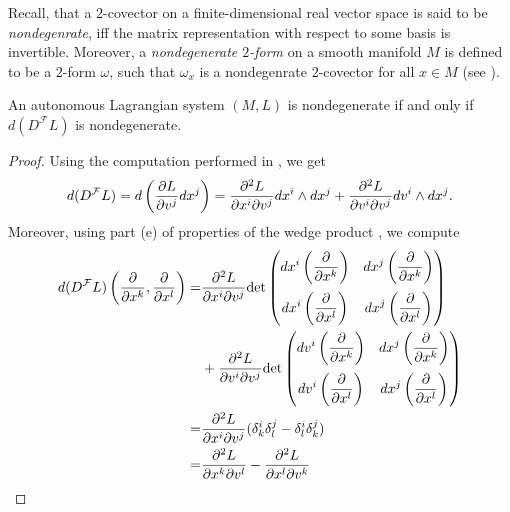 Recall, that a $2$-covector on a finite-dimensional real vector space is said to be \emph{nondegenrate}, iff the matrix representation with respect to some basis is invertible. Moreover, a \emph{nondegenerate $2$-form} on a smooth manifold $M$ is defined to be a $2$-form $\omega$, such that $\omega_x$ is a nondegenrate $2$-covector for all $x \in M$ (see \cite[565,567]{lee:smooth_manifolds:2013}). 

\begin{proposition}
	An autonomous Lagrangian system $(M,L)$ is nondegenerate if and only if $d(D^\mathcal{F}L)$ is nondegenerate.
\end{proposition}

\begin{proof}
	Using the computation performed in \cite[363]{lee:smooth_manifolds:2013}, we get
	\begin{equation*}
		d(D^\mathcal{F}L) = d\del[3]{\frac{\partial L}{\partial v^j}dx^j} = \frac{\partial^2 L}{\partial x^i\partial v^j}dx^i \wedge dx^j + \frac{\partial^2L}{\partial v^i\partial v^j}dv^i \wedge dx^j.
	\end{equation*}
	Moreover, using part (e) of properties of the wedge product \cite[356]{lee:smooth_manifolds:2013}, we compute
	\begin{align*}
		d(D^\mathcal{F}L)\del[3]{\frac{\partial}{\partial x^k},\frac{\partial}{\partial x^l}} =& \frac{\partial^2 L}{\partial x^i\partial v^j}\det\begin{pmatrix}
			\displaystyle dx^i\del[3]{\frac{\partial}{\partial x^k}} & \displaystyle dx^j\del[3]{\frac{\partial}{\partial x^k}}\\[4mm]
			\displaystyle dx^i\del[3]{\frac{\partial}{\partial x^l}} & \displaystyle dx^j\del[3]{\frac{\partial}{\partial x^l}}
		\end{pmatrix}\\ 
		&+ \frac{\partial^2L}{\partial v^i\partial v^j}\det\begin{pmatrix}
			\displaystyle dv^i\del[3]{\frac{\partial}{\partial x^k}} & \displaystyle dx^j\del[3]{\frac{\partial}{\partial x^k}}\\[4mm]
			\displaystyle dv^i\del[3]{\frac{\partial}{\partial x^l}} & \displaystyle dx^j\del[3]{\frac{\partial}{\partial x^l}}
		\end{pmatrix}\\
		=& \frac{\partial^2 L}{\partial x^i\partial v^j}(\delta^i_k\delta^j_l - \delta^i_l\delta^j_k)\\
		=& \frac{\partial^2 L}{\partial x^k\partial v^l} - \frac{\partial^2 L}{\partial x^l\partial v^k}

\end{align*}
\end{proof}
